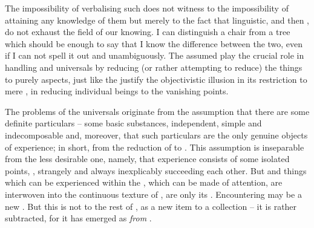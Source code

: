 The impossibility of verbalising such  does not witness to the
impossibility of attaining any knowledge of them but merely to the fact that
linguistic, and then ,  do not exhaust the field
of our knowing. I can distinguish a chair from a tree which should be enough to
say that I know the difference between the two, even if I can not spell it out
 and unambiguously. The assumed  play the crucial
role in handling  and universals by reducing (or rather attempting
to reduce) the  things to purely  aspects, just like
the  justify the objectivistic illusion in its restriction to
mere , in reducing individual beings to the vanishing points.


\pa The problems of the universals originate from the assumption that there
are some definite particulars -- some basic substances, independent, simple and
indecomposable and, moreover, that such particulars are the only genuine objects
of experience; in short, from the reduction of  to
. This assumption is inseparable from the less desirable one, 
namely, that experience consists of some isolated points, , strangely
and always inexplicably succeeding each other.  But 
  and things which can be experienced within the \hoa,
which can be made  of attention, are interwoven into the
continuous texture of , are only its .
Encountering  may be a new . But this is not  to the rest of , as a
new item to a collection --  it is 
rather subtracted, for it has emerged as  {\em from}
.

